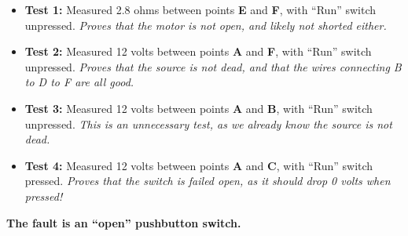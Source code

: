 
\begin{itemize}
\item{} {\bf Test 1:} Measured 2.8 ohms between points {\bf E} and {\bf F}, with ``Run'' switch unpressed.  {\it Proves that the motor is not open, and likely not shorted either.}
\vskip 5pt
\item{} {\bf Test 2:} Measured 12 volts between points {\bf A} and {\bf F}, with ``Run'' switch unpressed.  {\it Proves that the source is not dead, and that the wires connecting B to D to F are all good.}
\vskip 5pt
\item{} {\bf Test 3:} Measured 12 volts between points {\bf A} and {\bf B}, with ``Run'' switch unpressed.  {\it This is an unnecessary test, as we already know the source is not dead.}
\vskip 5pt
\item{} {\bf Test 4:} Measured 12 volts between points {\bf A} and {\bf C}, with ``Run'' switch pressed.  {\it Proves that the switch is failed open, as it should drop 0 volts when pressed!}
\end{itemize}

\vskip 10pt

{\bf The fault is an ``open'' pushbutton switch.}











